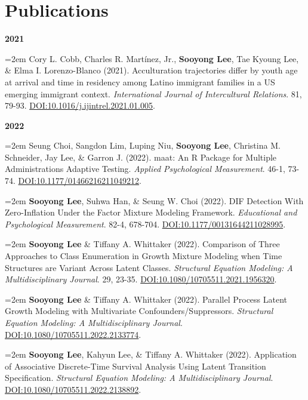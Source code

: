 \documentclass[11pt,letterpaper,]{awesome-me}
\begin{document}
\hypertarget{publications}{%
\section{Publications}\label{publications}}

\setlength{\leftskip}{0cm}

\textbf{2021}

\setlength{\leftskip}{0.5cm}

\hangindent=2em  Cory L. Cobb, Charles R. Martínez, Jr.,
\textbf{Sooyong Lee}, Tae Kyoung Lee, \& Elma I. Lorenzo-Blanco (2021).
Acculturation trajectories differ by youth age at arrival and time in
residency among Latino immigrant families in a US emerging immigrant
context. \emph{International Journal of Intercultural Relations}. 81,
79-93. \url{DOI:10.1016/j.ijintrel.2021.01.005}.

\setlength{\leftskip}{0cm}

\textbf{2022}

\setlength{\leftskip}{0.5cm}

\hangindent=2em  Seung Choi, Sangdon Lim, Luping Niu,
\textbf{Sooyong Lee}, Christina M. Schneider, Jay Lee, \& Garron J.
(2022). maat: An R Package for Multiple Administrations Adaptive
Testing. \emph{Applied Psychological Measurement}. 46-1, 73-74.
\url{DOI:10.1177/01466216211049212}.

\hangindent=2em  \textbf{Sooyong Lee}, Suhwa Han, \& Seung
W. Choi (2022). DIF Detection With Zero-Inflation Under the Factor
Mixture Modeling Framework. \emph{Educational and Psychological
Measurement}. 82-4, 678-704. \url{DOI:10.1177/00131644211028995}.

\hangindent=2em  \textbf{Sooyong Lee} \& Tiffany A.
Whittaker (2022). Comparison of Three Approaches to Class Enumeration in
Growth Mixture Modeling when Time Structures are Variant Across Latent
Classes. \emph{Structural Equation Modeling: A Multidisciplinary
Journal}. 29, 23-35. \url{DOI:10.1080/10705511.2021.1956320}.

\hangindent=2em  \textbf{Sooyong Lee} \& Tiffany A.
Whittaker (2022). Parallel Process Latent Growth Modeling with
Multivariate Confounders/Suppressors. \emph{Structural Equation
Modeling: A Multidisciplinary Journal}.
\url{DOI:10.1080/10705511.2022.2133774}.

\hangindent=2em  \textbf{Sooyong Lee}, Kahyun Lee, \&
Tiffany A. Whittaker (2022). Application of Associative Discrete-Time
Survival Analysis Using Latent Transition Specification.
\emph{Structural Equation Modeling: A Multidisciplinary Journal}.
\url{DOI:10.1080/10705511.2022.2138892}.
\end{document}

